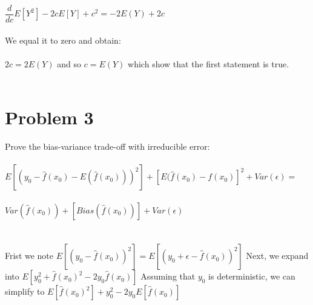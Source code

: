 \documentclass[11pt,a4paper,twoside,openright]{report}
\begin{document}
	 
	$ \dfrac{d}{dc}E[Y^2] - 2cE[Y] + c^2 = -2E(Y) + 2c $ \\\\
	
	We equal it to zero and obtain:\\\\
	
	$2c = 2E(Y)$ and so $c = E(Y)$ which show that the first statement is true. \\\\
	
	
	\section*{Problem 3}
	
	Prove the bias-variance trade-off with irreducible error:\\\\
	
	
	
	$E[(y_{0} - \hat{f}(x_{0}) - E(\hat{f}(x_{0})))^2] + [E(\hat{f}(x_{0}) - f(x_{0})]^2 + Var(\epsilon) =$\\\\
	
	$Var(\hat{f}(x_{0})) + [Bias(\hat{f}(x_{0}))] + Var(\epsilon)$\\
	\\\\
	
  Frist we note $E[(y_{0} - \hat{f}(x_{0}))^2] = E[(y_{0} + \epsilon - \hat{f}(x_{0}))^2]$ 
	Next, we expand into $E[y_{0}^2 + \hat{f}(x_{0})^2 - 2y_{0}\hat{f}(x_{0})]$
  Assuming that $y_{0}$ is deterministic, we can simplify to $E[\hat{f}(x_{0})^2] + y_{0}^2 - 2y_{0}E[\hat{f}(x_{0})]$
	
	
	
	
	
	
	
	
	
	
	
	
	
	
	
	
	
	
	
	
	
	
\end{document}
